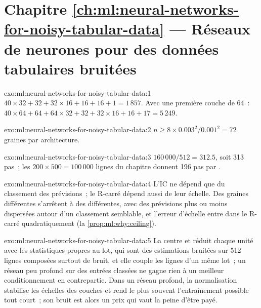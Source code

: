 \section*{Chapitre \ref{ch:ml:neural-networks-for-noisy-tabular-data} --- Réseaux de neurones pour des données tabulaires bruitées}

\begin{solution}{exo:ml:neural-networks-for-noisy-tabular-data:1}
$40\times32 + 32 + 32\times16 + 16 + 16 + 1 = 1\,857$. Avec une première couche de 64~: $40\times64 + 64 + 64\times32 + 32 +
32\times16 + 16 + 17 = 5\,249$.
\end{solution}

\begin{solution}{exo:ml:neural-networks-for-noisy-tabular-data:2}
$n \ge 8\times0.003^2/0.001^2 = 72$ graines par architecture.
\end{solution}

\begin{solution}{exo:ml:neural-networks-for-noisy-tabular-data:3}
$160\,000/512 = 312.5$, soit 313 pas~; les $200\times500 = 100\,000$ lignes du chapitre donnent 196 pas par .
\end{solution}

\begin{solution}{exo:ml:neural-networks-for-noisy-tabular-data:4}
L'IC ne dépend que du classement des prévisions~; le R-carré dépend aussi de leur échelle. Des graines différentes s'arrêtent à
des  différentes, avec des prévisions plus ou moins dispersées autour d'un classement semblable, et l'erreur d'échelle entre dans le R-carré
quadratiquement (la \cref{prop:ml:why:ceiling}).
\end{solution}

\begin{solution}{exo:ml:neural-networks-for-noisy-tabular-data:5}
La  centre et réduit chaque unité avec les statistiques propres au lot, qui sont des estimations bruitées sur 512 lignes
composées surtout de bruit, et elle couple les lignes d'un même lot~; un réseau peu profond sur des entrées classées ne gagne rien
à un meilleur conditionnement en contrepartie. Dans un réseau profond, la normalisation stabilise les échelles des couches et rend le plus souvent
l'entraînement possible tout court~; son bruit est alors un prix qui vaut la peine d'être payé.
\end{solution}

